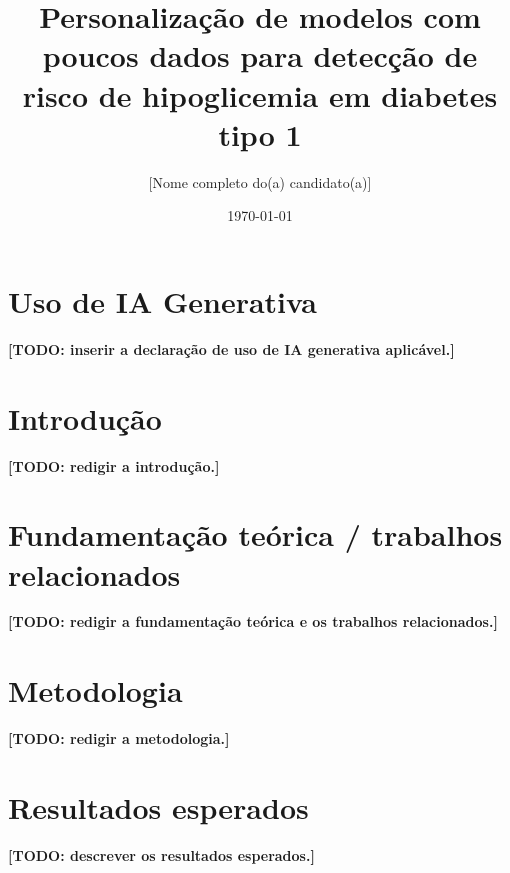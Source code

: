 \documentclass{article}
\title{Personalização de modelos com poucos dados para detecção de risco de hipoglicemia em diabetes tipo 1}
\author{[Nome completo do(a) candidato(a)]}
\date{\today}
\begin{document}
\maketitle


\section*{Uso de IA Generativa}

\textbf{[TODO: inserir a declaração de uso de IA generativa aplicável.]}

\section{Introdução}

\textbf{[TODO: redigir a introdução.]}

\section{Fundamentação teórica / trabalhos relacionados}

\textbf{[TODO: redigir a fundamentação teórica e os trabalhos relacionados.]}

\section{Metodologia}

\textbf{[TODO: redigir a metodologia.]}

\section{Resultados esperados}

\textbf{[TODO: descrever os resultados esperados.]}



\end{document}
